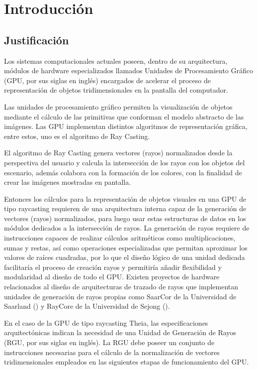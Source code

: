 \chapter{Introducción}

\section{Justificación}
Los sistemas computacionales actuales poseen, dentro de su arquitectura, módulos de hardware especializados llamados Unidades de Procesamiento Gráfico (GPU, por sus siglas en inglés) encargados de acelerar el proceso de representación de objetos tridimensionales en la pantalla del computador.

Las unidades de procesamiento gráfico permiten la visualización de objetos mediante el cálculo de las primitivas que conforman el modelo abstracto de las imágenes. Las GPU implementan distintos algoritmos  de representación gráfica, entre estos, uno es el algoritmo de Ray Casting.

El algoritmo de Ray Casting genera vectores (rayos) normalizados desde la perspectiva del usuario y calcula la intersección de los rayos con los objetos del escenario, además colabora con la formación de los colores, con la finalidad de crear las imágenes mostradas en pantalla.

Entonces los cálculos para la representación de objetos visuales en una GPU de tipo raycasting requieren de una arquitectura interna capaz de la generación de vectores (rayos) normalizados,  para luego usar estas estructuras de datos en los módulos dedicados a la intersección de rayos. La generación de rayos requiere de instrucciones capaces de  realizar cálculos aritméticos como multiplicaciones, sumas y restas, así como operaciones especializadas que permitan aproximar los valores de raíces cuadradas, por lo que el diseño lógico de una unidad dedicada facilitaría el proceso de creación rayos y permitiría añadir flexibilidad y modularidad al diseño de todo el GPU. Existen proyectos de hardware relacionados al diseño de arquitecturas de trazado de rayos que implementan unidades de generación de rayos propias como SaarCor de la Universidad de Saarland (\cite{Schmittler2004}) y RayCore de la Universidad de Sejong (\cite{Nah2014}). 

En el caso de la GPU de tipo raycasting Theia, las especificaciones arquitectónicas indican la necesidad de una Unidad de Generación de Rayos (RGU, por sus siglas en inglés). La RGU debe poseer un conjunto de instrucciones necesarias para el cálculo de la normalización de vectores tridimensionales empleados en las siguientes etapas de funcionamiento del GPU.

